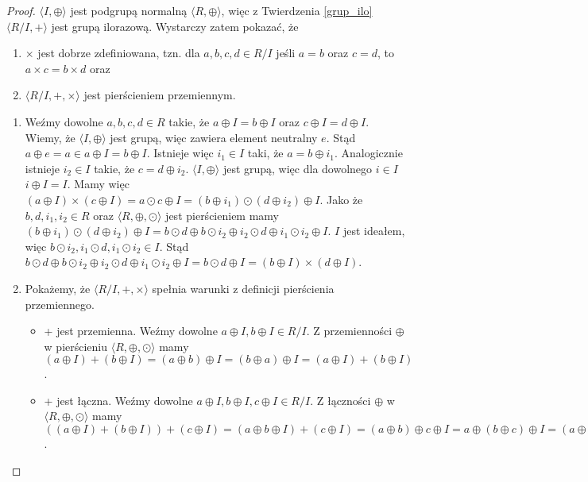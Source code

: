 \documentclass[declaration,shortabstract]{iithesis}
\theoremstyle{definition}
\theoremstyle{remark} \newtheorem{observation}{Obserwacja}
\theoremstyle{plain} \newtheorem{theorem}{Twierdzenie}
\theoremstyle{plain} \newtheorem{lemma}{Lemat}
\theoremstyle{remark} \newtheorem*{remark*}{Uwaga}
\theoremstyle{reminder} \newtheorem*{reminder*}{Przypomnienie}
\begin{document}
\begin{proof}
	$\langle I, \oplus \rangle$ jest podgrupą normalną $\langle R, \oplus \rangle$, więc z Twierdzenia \ref{grup_ilo} $\langle R/I, + \rangle$ jest grupą ilorazową. Wystarczy zatem pokazać, że 
	\begin{enumerate}[label=\arabic*.,leftmargin=.4in]
		\item $\times$ jest dobrze zdefiniowana, tzn. dla $a, b, c, d \in R/I$ jeśli $a = b$ oraz $c = d$, to $a \times c = b \times d$ oraz 
		\item $\langle R/I, +, \times \rangle$ jest pierścieniem przemiennym.
	\end{enumerate}
	\begin{enumerate}[label=Ad.\arabic*.,leftmargin=.4in]
		\item Weźmy dowolne $a, b, c, d \in R$ takie, że $a \oplus I = b \oplus I$ oraz $c \oplus I = d \oplus I$. Wiemy, że $\langle I, \oplus \rangle$ jest grupą, więc zawiera element neutralny $e$. Stąd $a \oplus e = a \in a \oplus I = b \oplus I$. Istnieje więc $i_1 \in I$ taki, że $a = b \oplus i_1$. Analogicznie istnieje $i_2 \in I$ takie, że $c = d \oplus i_2$. \newline
		      $\langle I, \oplus \rangle$ jest grupą, więc dla dowolnego $i \in I$ $i \oplus I = I$. \newline
		      Mamy więc $(a \oplus I) \times (c \oplus I) = a \odot c \oplus I = (b \oplus i_1) \odot (d \oplus i_2) \oplus I$. Jako że $b, d, i_1, i_2 \in R$ oraz $\langle R, \oplus, \odot \rangle$ jest pierścieniem mamy $(b \oplus i_1) \odot (d \oplus i_2) \oplus I = b \odot d \oplus b \odot i_2 \oplus i_2 \odot d \oplus i_1 \odot i_2 \oplus I$. $I$ jest ideałem, więc $b \odot i_2, i_1 \odot d, i_1 \odot i_2 \in I$. Stąd $b \odot d \oplus b \odot i_2 \oplus i_2 \odot d \oplus i_1 \odot i_2 \oplus I = b \odot d \oplus I = (b \oplus I) \times (d \oplus I)$.
		\item Pokażemy, że $\langle R/I, +, \times \rangle$ spełnia warunki z definicji pierścienia przemiennego.
		      \begin{itemize}	    
		      	\item + jest przemienna. Weźmy dowolne $a \oplus I, b \oplus I \in R/I$. Z przemienności $\oplus$ w pierścieniu $\langle R, \oplus, \odot \rangle$ mamy $(a \oplus I) + (b \oplus I) = (a \oplus b) \oplus I = (b \oplus a) \oplus I = (a \oplus I) + (b \oplus I)$.
		      	\item + jest łączna. Weźmy dowolne $a \oplus I, b \oplus I, c \oplus I \in R/I$. Z łączności $\oplus$ w $\langle R, \oplus, \odot \rangle$ mamy $((a \oplus I) + (b \oplus I)) + (c \oplus I) = (a \oplus b \oplus I) + (c \oplus I) = (a \oplus b) \oplus c \oplus I = a \oplus (b \oplus c) \oplus I = (a \oplus I) + (b \oplus c \oplus I) = (a \oplus I) + ((b \oplus I) + (c \oplus I))$.

\end{itemize}
\end{enumerate}
\end{proof}
\end{document}
